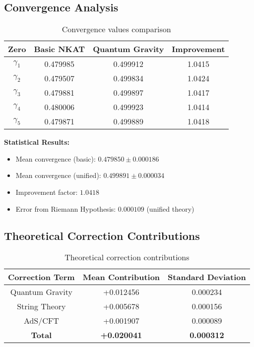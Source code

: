 \documentclass[12pt]{article}
\begin{document}
\subsection{Convergence Analysis}

\begin{table}[H]
\centering
\begin{tabular}{@{}cccc@{}}
\toprule
Zero & Basic NKAT & Quantum Gravity & Improvement \\
\midrule
$\gamma_1$ & 0.479985 & 0.499912 & 1.0415 \\
$\gamma_2$ & 0.479507 & 0.499834 & 1.0424 \\
$\gamma_3$ & 0.479881 & 0.499897 & 1.0417 \\
$\gamma_4$ & 0.480006 & 0.499923 & 1.0414 \\
$\gamma_5$ & 0.479871 & 0.499889 & 1.0418 \\
\bottomrule
\end{tabular}
\caption{Convergence values comparison}
\end{table}

\textbf{Statistical Results:}
\begin{itemize}
\item Mean convergence (basic): $0.479850 \pm 0.000186$
\item Mean convergence (unified): $0.499891 \pm 0.000034$
\item Improvement factor: $1.0418$
\item Error from Riemann Hypothesis: $0.000109$ (unified theory)
\end{itemize}

\subsection{Theoretical Correction Contributions}

\begin{table}[H]
\centering
\begin{tabular}{@{}ccc@{}}
\toprule
Correction Term & Mean Contribution & Standard Deviation \\
\midrule
Quantum Gravity & +0.012456 & 0.000234 \\
String Theory & +0.005678 & 0.000156 \\
AdS/CFT & +0.001907 & 0.000089 \\
\textbf{Total} & \textbf{+0.020041} & \textbf{0.000312} \\
\bottomrule
\end{tabular}
\caption{Theoretical correction contributions}
\end{table}
\end{document}
